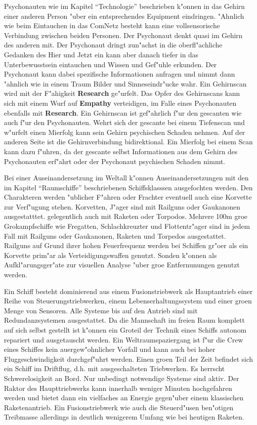 Psychonauten wie im Kapitel ``Technologie'' beschrieben k"onnen in das Gehirn einer anderen Person "uber ein entsprechendes Equipment eindringen. "Ahnlich wie beim Eintauchen in das ComNetz besteht kann eine vollsensorische Verbindung zwischen beiden Personen. Der Psychonaut denkt quasi im Gehirn des anderen mit. Der Psychonaut dringt zun"achst in die oberfl"achliche Gedanken des Hier und Jetzt ein kann aber danach tiefer in das Unterbewusstsein eintauchen und Wissen und Gef"uhle erkunden. Der Psychonaut kann dabei spezifische Informationen anfragen und nimmt dann "ahnlich wie in einem Traum Bilder und Sinneseindr"ucke wahr. Ein Gehirnscan wird mit der F"ahigkeit \textbf{Research} ge"urfelt. Das Opfer des Gehirnscans kann sich mit einem Wurf auf \textbf{Empathy} verteidigen, im Falle eines Psychonauten ebenfalls mit \textbf{Research}. Ein Gehirnscan ist gef"ahrlich f"ur den gescanten wie auch f"ur den Psychonauten. Wehrt sich der gescante bei einem Tiefenscan und w"urfelt einen Mi\3erfolg kann sein Gehirn psychischen Schaden nehmen. Auf der anderen Seite ist die Gehirnverbindung bidirektional. Ein Mi\3erfolg bei einem Scan kann dazu f"uhren, da\3 der gescante selbst Informationen aus dem Gehirn des Psychonauten erf"ahrt oder der Psychonaut psychischen Schaden nimmt.

Bei einer Auseinandersetzung im Weltall k"onnen Auseinandersetzungen mit den im Kapitel ``Raumschiffe'' beschriebenen Schiffsklasssen ausgefochten werden. Den Charakteren werden "ublicher F"ahren oder Frachter eventuell auch eine Korvette zur Verf"ugung stehen. Korvetten, J"ager sind mit Railguns oder Gau\3kanonen ausgestatttet. gelegentlich auch mit Raketen oder Torpodos. Mehrere 100m gro\3e Gro\3kampfschiffe wie Fregatten, Schlachkreuzter und Flottentr"ager sind in jedem Fall mit Railguns oder Gau\3kanonen, Raketen und Torpedos ausgestattet. Railguns auf Grund ihrer hohen Feuerfrequenz werden bei Schiffen gr"o\3er als ein Korvette prim"ar als Verteidigungswaffen genutzt. Sonden k"onnen als Aufkl"arungsger"ate zur visuellen Analyse "uber gro\3e Entfernunungen genutzt werden.

Ein Schiff besteht dominierend aus einem Fusionstriebwerk als Hauptantrieb einer Reihe von Steuerungstriebwerken, einem Lebenserhaltungssystem und einer gro\3en Menge von Sensoren. Alle Systeme bis auf den Antrieb sind mit Redundanzsystemen ausgestattet. Da die Mannschaft im freien Raum komplett auf sich selbst gestellt ist k"onnen ein Gro\3teil der Technik eines Schiffs autonom repariert und ausgetauscht werden. Ein Weltraumspaziergang ist f"ur die Crew eines Schiffes kein au\3ergew"ohnlicher Vorfall und kann auch bei hoher Fluggeschwindigkeit durchgef"uhrt werden. Einen gro\3en Teil der Zeit befindet sich ein Schiff im Driftflug, d.h. mit ausgeschalteten Triebwerken. Es herrscht Schwerelosigkeit an Bord. Nur unbedingt notwendige Systeme sind aktiv. Der Raktor des Haupttriebwerks kann innerhalb weniger Minuten hochgefahren werden und bietet dann ein vielfaches an Energie gegen"uber einem klassischen Raketenantrieb. Ein Fusionstriebwerk wie auch die Steuerd"usen ben"otigen Treibmasse allerdings in deutlich wenigerem Umfang wie bei heutigen Raketen.

